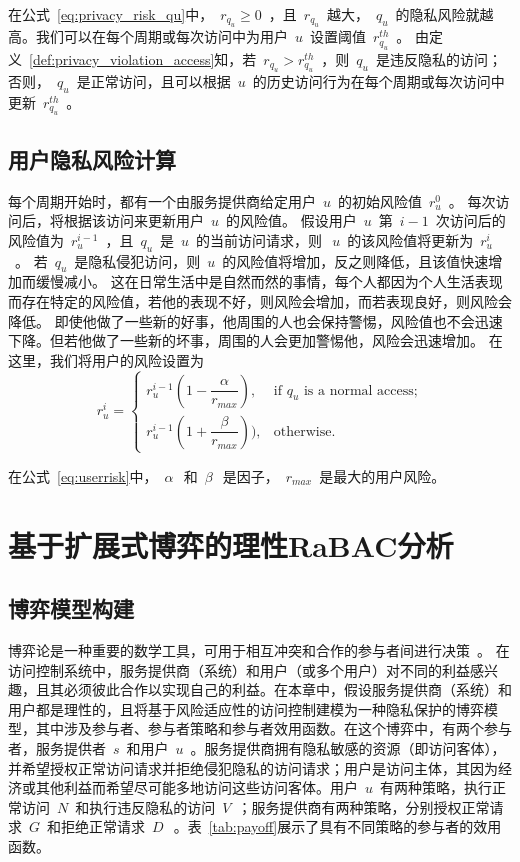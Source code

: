 在公式~\ref{eq:privacy_risk_qu}中，~$r_{q_u} \geq 0$~，且~$r_{q_u}$~越大，~$q_u$~的隐私风险就越高。我们可以在每个周期或每次访问中为用户~$u$~设置阈值~$r_{q_u}^{th}$~。 由定义~\ref{def:privacy_violation_access}知，若~$r_{q_u} > r_{q_u}^{th}$~，则~$q_u$~是违反隐私的访问；否则，~$q_u$~是正常访问，且可以根据~$u$~的历史访问行为在每个周期或每次访问中更新~$r_{q_u}^{th}$~。

\subsection{用户隐私风险计算}

每个周期开始时，都有一个由服务提供商给定用户~${u}$~的初始风险值~${r_u ^ 0}$~。 每次访问后，将根据该访问来更新用户~${u}$~的风险值。 假设用户~${u}$~第~${{i-1}}$~次访问后的风险值为~${r_u ^ {i-1}}$~，且~${q_u}$~是~${u}$~的当前访问请求，则~$~ {u}$~的该风险值将更新为~${r_u ^ {i}}$~。 若~${q_u}$~是隐私侵犯访问，则~${u}$~的风险值将增加，反之则降低，且该值快速增加而缓慢减小。 这在日常生活中是自然而然的事情，每个人都因为个人生活表现而存在特定的风险值，若他的表现不好，则风险会增加，而若表现良好，则风险会降低。 即使他做了一些新的好事，他周围的人也会保持警惕，风险值也不会迅速下降。但若他做了一些新的坏事，周围的人会更加警惕他，风险会迅速增加。 在这里，我们将用户的风险设置为
\begin{equation}\label{eq:userrisk}
r_u^{i}=\left\{ 
\begin{array}{cl}
r_u^{i-1}(1-\dfrac{\alpha}{r_{max}}), & \text{if } q_u \text{ is a normal access;}\\
r_u^{i-1}(1+\dfrac{\beta}{r_{max}})), & \text{otherwise.}
\end{array}
\right.
\end{equation}

在公式~\ref{eq:userrisk}中，~$\alpha~$~和~$\beta~$~是因子，~$r_{max}$~是最大的用户风险。

\section{基于扩展式博弈的理性RaBAC分析}
\label{sec:gamemodel}

\subsection{博弈模型构建}

博弈论是一种重要的数学工具，可用于相互冲突和合作的参与者间进行决策~\cite{owen2001game}。
在访问控制系统中，服务提供商（系统）和用户（或多个用户）对不同的利益感兴趣，且其必须彼此合作以实现自己的利益。在本章中，假设服务提供商（系统）和用户都是理性的，且将基于风险适应性的访问控制建模为一种隐私保护的博弈模型，其中涉及参与者、参与者策略和参与者效用函数。在这个博弈中，有两个参与者，服务提供者~$s$~和用户~$u$~。服务提供商拥有隐私敏感的资源（即访问客体），并希望授权正常访问请求并拒绝侵犯隐私的访问请求；用户是访问主体，其因为经济或其他利益而希望尽可能多地访问这些访问客体。用户~$u$~有两种策略，执行正常访问~$N$~和执行违反隐私的访问~$V$~；服务提供商有两种策略，分别授权正常请求~$G$~和拒绝正常请求~$D~$~。表~\ref{tab:payoff}展示了具有不同策略的参与者的效用函数。

